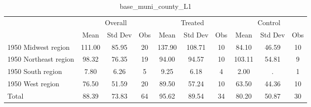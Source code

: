 \begin{table}[htbp]\centering
\def\sym#1{\ifmmode^{#1}\else\(^{#1}\)\fi}
\caption{base\_muni\_county\_L1 \label{tab1}}
\begin{tabular}{l*{3}{ccc}}
\toprule
                    &\multicolumn{3}{c}{Overall}           &\multicolumn{3}{c}{Treated}           &\multicolumn{3}{c}{Control}           \\
                    &        Mean&     Std Dev&         Obs&        Mean&     Std Dev&         Obs&        Mean&     Std Dev&         Obs\\
\midrule
1950 Midwest region &      111.00&       85.95&          20&      137.90&      108.71&          10&       84.10&       46.59&          10\\
1950 Northeast region&       98.32&       76.35&          19&       94.00&       94.57&          10&      103.11&       54.81&           9\\
1950 South region   &        7.80&        6.26&           5&        9.25&        6.18&           4&        2.00&           .&           1\\
1950 West region    &       76.50&       51.59&          20&       89.50&       57.24&          10&       63.50&       44.36&          10\\
Total               &       88.39&       73.83&          64&       95.62&       89.54&          34&       80.20&       50.87&          30\\
\bottomrule
\end{tabular}
\end{table}
